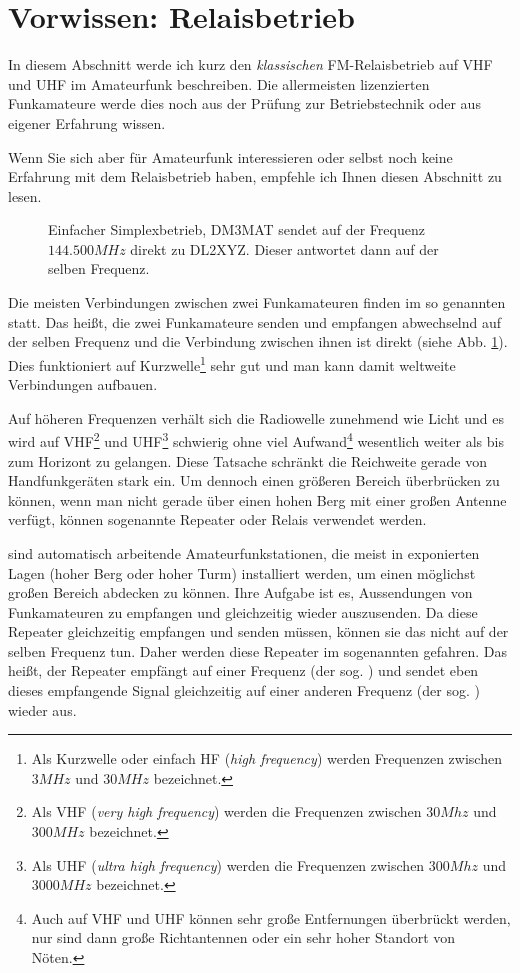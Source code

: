 \section{Vorwissen: Relaisbetrieb} \label{sec:vorwissen} 
In diesem Abschnitt werde ich kurz den \emph{klassischen} FM-Relaisbetrieb auf VHF und UHF im Amateurfunk beschreiben. Die allermeisten lizenzierten Funkamateure werde dies noch aus der Prüfung zur Betriebstechnik oder aus eigener Erfahrung wissen. 

Wenn Sie sich aber für Amateurfunk interessieren oder selbst noch keine Erfahrung mit dem Relaisbetrieb haben, empfehle ich Ihnen diesen Abschnitt zu lesen. 

\begin{figure}[!ht]
 \centering
 
 
 \caption{Einfacher Simplexbetrieb, DM3MAT sendet auf der Frequenz $144.500 MHz$ direkt zu DL2XYZ. Dieser antwortet dann auf der selben Frequenz.} \label{fig:basicsimlpex}
\end{figure}

Die meisten Verbindungen zwischen zwei Funkamateuren finden im so genannten  statt. Das heißt, die zwei Funkamateure senden und empfangen abwechselnd auf der selben Frequenz und die Verbindung zwischen ihnen ist direkt (siehe Abb. \ref{fig:basicsimlpex}). Dies funktioniert auf Kurzwelle\footnote{Als Kurzwelle oder einfach HF (\emph{high frequency}) werden Frequenzen zwischen $3MHz$ und $30MHz$ bezeichnet.} sehr gut und man kann damit weltweite Verbindungen aufbauen. 

Auf höheren Frequenzen verhält sich die Radiowelle zunehmend wie Licht und es wird auf VHF\footnote{Als VHF (\emph{very high frequency}) werden die Frequenzen zwischen $30Mhz$ und $300MHz$ bezeichnet.} und UHF\footnote{Als UHF (\emph{ultra high frequency}) werden die Frequenzen zwischen $300Mhz$ und $3000MHz$ bezeichnet.} schwierig ohne viel Aufwand\footnote{Auch auf VHF und UHF können sehr große Entfernungen überbrückt werden, nur sind dann große Richtantennen oder ein sehr hoher Standort von Nöten.} wesentlich weiter als bis zum Horizont zu gelangen. Diese Tatsache schränkt die Reichweite gerade von Handfunkgeräten stark ein. Um dennoch einen größeren Bereich überbrücken zu können, wenn man nicht gerade über einen hohen Berg mit einer großen Antenne verfügt, können sogenannte Repeater oder Relais verwendet werden. 

 sind automatisch arbeitende Amateurfunkstationen, die meist in exponierten Lagen (hoher Berg oder hoher Turm) installiert werden, um einen möglichst großen Bereich abdecken zu können. Ihre Aufgabe ist es, Aussendungen von Funkamateuren zu empfangen und gleichzeitig wieder auszusenden. Da diese Repeater gleichzeitig empfangen und senden müssen, können sie das nicht auf der selben Frequenz tun. Daher werden diese Repeater im sogenannten  gefahren. Das heißt, der Repeater empfängt auf einer Frequenz (der sog. ) und sendet eben dieses empfangende Signal gleichzeitig auf einer anderen Frequenz (der sog. ) wieder aus. 

